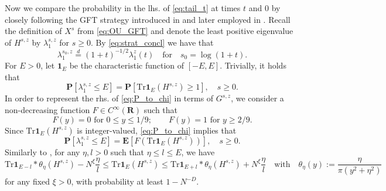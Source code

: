 \documentclass[10pt]{amsart}
\numberwithin{equation}{section}
\newcommand{\E}{\mathbf{E}}
\newcommand{\R}{\mathbf{R}}
\begin{document}
Now we compare the probability in the lhs. of \eqref{eq:tail_t} at times $t$ and $0$ by closely following the GFT strategy introduced in \cite{EYY12} and later employed in \cite{small_dev, LFL_Wigner}. Recall the definition of $X^s$ from \eqref{eq:OU_GFT} and denote the least positive eigenvalue of $H^{s,z}$ by $\lambda_1^{s,z}$ for $s\ge 0$. By \eqref{eq:strat_concl} we have that
\begin{equation}
\lambda_1^{s_0,z}\stackrel{d}{=}(1+t)^{-1/2}\lambda_1^z(t)\quad\text{for}\quad s_0=\log (1+t).
\label{eq:F_GFT_s_to_t}
\end{equation}
For $E>0$, let $\bm{1}_E$ be the characteristic function of $[-E,E]$. Trivially, it holds that
\begin{equation}
\mathbf{P}[\lambda_1^{s,z}\le E] = \mathbf{P}\left[\mathrm{Tr}\bm{1}_E(H^{s,z})\ge 1\right],\quad s\ge 0. 
\label{eq:P_to_chi}
\end{equation}
In order to represent the rhs. of \eqref{eq:P_to_chi} in terms of $G^{s,z}$, we consider a non-decreasing function $F\in C^\infty(\R)$ such that
\begin{equation*}
F(y)=0\,\, \text{for}\,\, 0\le y\le 1/9;\qquad F(y)=1\,\, \text{for}\,\, y\ge 2/9.
\end{equation*}
Since $\mathrm{Tr}\bm{1}_E(H^{s,z})$ is integer-valued, \eqref{eq:P_to_chi} implies that
\begin{equation}
\mathbf{P}[\lambda_1^{s,z}\le E] = \E\left[F(\mathrm{Tr}\bm{1}_E(H^{s,z}))\right],\quad s\ge 0. 
\label{eq:P_to_F}
\end{equation}
Similarly to \cite[Lemma 2.3]{small_dev}, for any $\eta, l>0$ such that $\eta\le l\le E$, we have
\begin{equation}
\mathrm{Tr}\bm{1}_{E-l}*\theta_\eta(H^{s,z}) - N^\xi \frac{\eta}{l}\le \mathrm{Tr} \bm{1}_E(H^{s,z}) \le \mathrm{Tr}\bm{1}_{E+l}*\theta_\eta(H^{s,z}) + N^\xi \frac{\eta}{l}\quad\text{with}\quad \theta_\eta(y):=\frac{\eta}{\pi (y^2+\eta^2)}
\label{eq:lemF1}
\end{equation}
for any fixed $\xi>0$, with probability at least $1-N^{-D}$.
\end{document}
